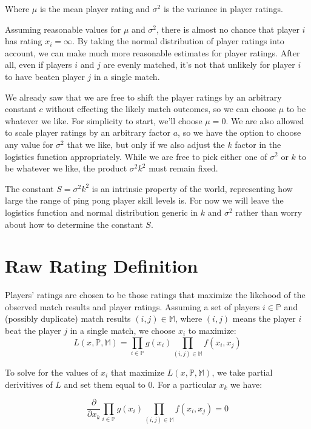 \documentclass{article}
\begin{document}
Where $\mu$ is the mean player rating and $\sigma^2$ is the variance in player
ratings.

Assuming reasonable values for $\mu$ and $\sigma^2$, there is almost no chance
that player $i$ has rating $x_i = \infty$. By taking the normal distribution
of player ratings into account, we can make much more reasonable estimates for
player ratings. After all, even if players $i$ and $j$ are evenly matched,
it's not that unlikely for player $i$ to have beaten player $j$ in a single
match.

We already saw that we are free to shift the player ratings by an
arbitrary constant $c$ without effecting the likely match outcomes, so we can
choose $\mu$ to be whatever we like. For simplicity to start, we'll choose
$\mu = 0$. We are also allowed to scale player ratings by an arbitrary factor
$a$, so we have the option to choose any value for $\sigma^2$ that we like,
but only if we also adjust the $k$ factor in the logistics function
appropriately. While we are free to pick either one of $\sigma^2$ or $k$ to be
whatever we like, the product $\sigma^2 k^2$ must remain fixed.

The constant $S = \sigma^2 k^2$ is an intrinsic property of the world,
representing how large the range of ping pong player skill levels is. For now
we will leave the logistics function and normal distribution generic in $k$
and $\sigma^2$ rather than worry about how to determine the constant $S$.

\section{Raw Rating Definition}
Players' ratings are chosen to be those ratings that maximize the likehood of
the observed match results and player ratings. Assuming a set of players
$i \in \mathbb{P}$ and (possibly duplicate) match results
$(i, j) \in \mathbb{M}$, where $(i, j)$ means the player $i$ beat the player
$j$ in a single match, we choose $x_i$ to maximize:
\begin{equation}
  L(x, \mathbb{P}, \mathbb{M}) = \prod_{i \in \mathbb{P}} g(x_i)  \prod_{(i, j) \in \mathbb{M}} f(x_i, x_j)
\end{equation}

To solve for the values of $x_i$ that maximize $L(x, \mathbb{P}, \mathbb{M})$,
we take partial derivitives of $L$ and set them equal to $0$. For a particular
$x_k$ we have:

\begin{equation}
  \frac{\partial}{\partial x_k} \prod_{i \in \mathbb{P}} g(x_i)  \prod_{(i, j) \in \mathbb{M}} f(x_i, x_j) = 0
\end{equation}
\end{document}
